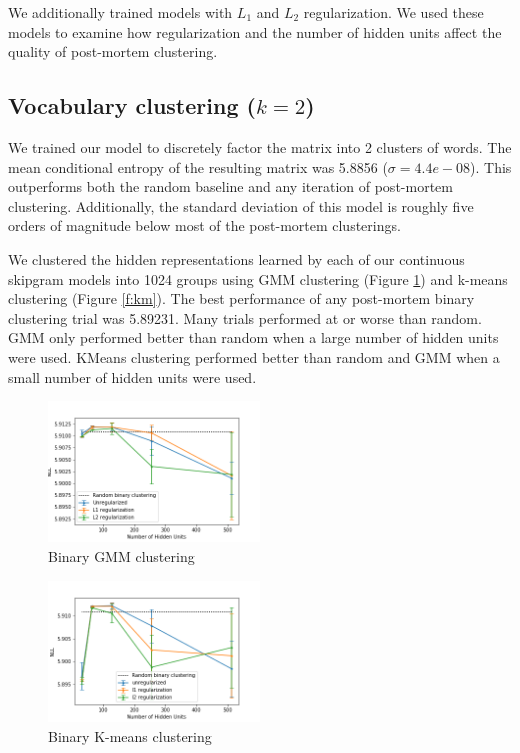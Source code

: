 \documentclass[11pt,letterpaper]{article}
\begin{document}
We additionally trained models with $L_1$ and $L_2$ regularization. We used these models to examine how regularization and the number of hidden units affect the quality of post-mortem clustering. 

\subsection{Vocabulary clustering ($k=2$)}

We trained our model to discretely factor the matrix into 2 clusters of words. The mean conditional entropy of the resulting matrix was 5.8856 ($\sigma=4.4e-08$). This outperforms both the random baseline and any iteration of post-mortem clustering. Additionally, the standard deviation of this model is roughly five orders of magnitude below most of the post-mortem clusterings.

We clustered the hidden representations learned by each of our continuous skipgram models into 1024 groups using GMM clustering (Figure \ref{f:bgmm}) and k-means clustering (Figure \ref{f:km}). The best performance of any post-mortem binary clustering trial was 5.89231. Many trials performed at or worse than random. GMM only performed better than random when a large number of hidden units were used. KMeans clustering performed better than random and GMM when a small number of hidden units were used.

\begin{figure}
  \caption{Binary GMM clustering}
\label{f:bgmm}
  \centering
    \includegraphics[width=0.5\textwidth]{binary_gmm.png}
\end{figure}

\begin{figure}
  \caption{Binary K-means clustering}
\label{f:bkm}
  \centering
    \includegraphics[width=0.5\textwidth]{binary_km.png}
\end{figure}
\end{document}
